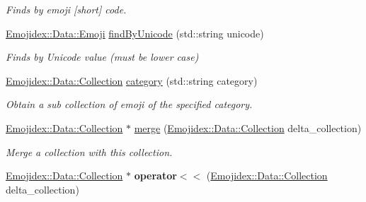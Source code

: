 \begin{DoxyCompactItemize}
\begin{DoxyCompactList}\small\item\em Finds by emoji \mbox{[}short\mbox{]} code. \end{DoxyCompactList}\item 
\hyperlink{classEmojidex_1_1Data_1_1Emoji}{Emojidex\+::\+Data\+::\+Emoji} \hyperlink{classEmojidex_1_1Data_1_1Collection_a54f948efec77f14099defd7e6172a5b0}{find\+By\+Unicode} (std\+::string unicode)\hypertarget{classEmojidex_1_1Data_1_1Collection_a54f948efec77f14099defd7e6172a5b0}{}\label{classEmojidex_1_1Data_1_1Collection_a54f948efec77f14099defd7e6172a5b0}

\begin{DoxyCompactList}\small\item\em Finds by Unicode value (must be lower case) \end{DoxyCompactList}\item 
\hyperlink{classEmojidex_1_1Data_1_1Collection}{Emojidex\+::\+Data\+::\+Collection} \hyperlink{classEmojidex_1_1Data_1_1Collection_a230c9aae3e864b28cc25b94d861246bb}{category} (std\+::string category)\hypertarget{classEmojidex_1_1Data_1_1Collection_a230c9aae3e864b28cc25b94d861246bb}{}\label{classEmojidex_1_1Data_1_1Collection_a230c9aae3e864b28cc25b94d861246bb}

\begin{DoxyCompactList}\small\item\em Obtain a sub collection of emoji of the specified category. \end{DoxyCompactList}\item 
\hyperlink{classEmojidex_1_1Data_1_1Collection}{Emojidex\+::\+Data\+::\+Collection} $\ast$ \hyperlink{classEmojidex_1_1Data_1_1Collection_a8166fb4585d12aa2843e7625a4accff2}{merge} (\hyperlink{classEmojidex_1_1Data_1_1Collection}{Emojidex\+::\+Data\+::\+Collection} delta\+\_\+collection)
\begin{DoxyCompactList}\small\item\em Merge a collection with this collection. \end{DoxyCompactList}\item 
\hyperlink{classEmojidex_1_1Data_1_1Collection}{Emojidex\+::\+Data\+::\+Collection} $\ast$ {\bfseries operator$<$$<$} (\hyperlink{classEmojidex_1_1Data_1_1Collection}{Emojidex\+::\+Data\+::\+Collection} delta\+\_\+collection)\hypertarget{classEmojidex_1_1Data_1_1Collection_abe7026c359c5cd222d61d34f38b1ce5d}{}\label{classEmojidex_1_1Data_1_1Collection_abe7026c359c5cd222d61d34f38b1ce5d}


\end{DoxyCompactItemize}
